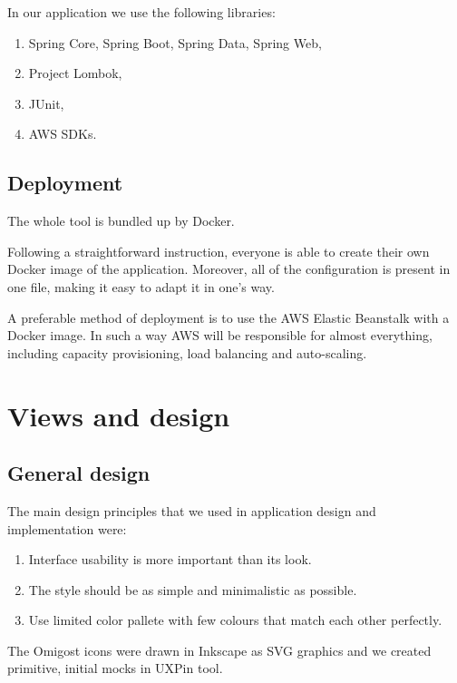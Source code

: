 \documentclass[licencjacka,en]{thesisclass}
\begin{document}
    In our application we use the following libraries:
    \begin{enumerate}
        \item Spring Core, Spring Boot, Spring Data, Spring Web,
        \item Project Lombok,
        \item JUnit,
        \item AWS SDKs.
    \end{enumerate}

    \subsection{Deployment}

    The whole tool is bundled up by Docker.

    Following a straightforward instruction, everyone is able
    to create their own Docker image of the application.
    Moreover, all of the configuration is present in one file,
    making it easy to adapt it in one's way.

    A preferable method of deployment is to use the AWS Elastic Beanstalk with a Docker image.
    In such a way AWS will be responsible for almost everything,
    including capacity provisioning, load balancing and auto-scaling.

    \section{Views and design}

    \subsection{General design}

    The main design principles that we used in application design and implementation were:
    \begin{enumerate}
        \item Interface usability is more important than its look.
        \item The style should be as simple and minimalistic as possible.
        \item Use limited color pallete with few colours that match each other perfectly.
    \end{enumerate}

    The Omigost icons were drawn in Inkscape as SVG graphics and we created primitive,
    initial mocks in UXPin \cite{UXPin} tool.
\end{document}
